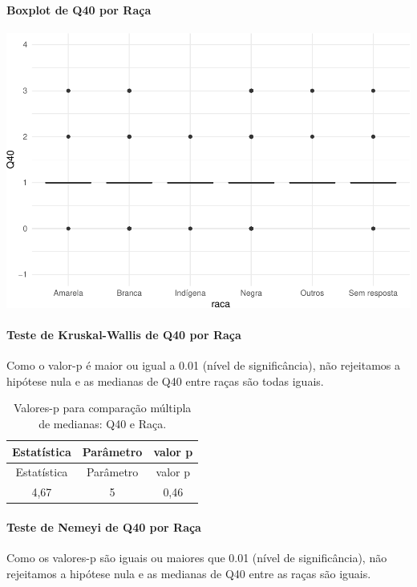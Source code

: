 \documentclass[]{article}
\let\oldparagraph\paragraph
\renewcommand{\paragraph}[1]{\oldparagraph{#1}\mbox{}}
\begin{document}
\hypertarget{boxplot-de-q40-por-rauxe7a}{%
\paragraph{Boxplot de Q40 por Raça}\label{boxplot-de-q40-por-rauxe7a}}

\begin{center}\includegraphics[width=0.75\linewidth]{relatorio_covid19_files/figure-latex/unnamed-chunk-1581-1} \end{center}

\hypertarget{teste-de-kruskal-wallis-de-q40-por-rauxe7a}{%
\paragraph{Teste de Kruskal-Wallis de Q40 por Raça}\label{teste-de-kruskal-wallis-de-q40-por-rauxe7a}}

Como o valor-p é maior ou igual a 0.01 (nível de significância), não rejeitamos a hipótese nula e as medianas de Q40 entre raças são todas iguais.

\begin{longtable}[]{@{}ccc@{}}
\caption{\label{tab:unnamed-chunk-1583}Valores-p para comparação múltipla de medianas: Q40 e Raça.}\tabularnewline
\toprule
Estatística & Parâmetro & valor p\tabularnewline
\midrule
\endfirsthead
\toprule
Estatística & Parâmetro & valor p\tabularnewline
\midrule
\endhead
4,67 & 5 & 0,46\tabularnewline
\bottomrule
\end{longtable}

\hypertarget{teste-de-nemeyi-de-q40-por-rauxe7a}{%
\paragraph{Teste de Nemeyi de Q40 por Raça}\label{teste-de-nemeyi-de-q40-por-rauxe7a}}

Como os valores-p são iguais ou maiores que 0.01 (nível de significância), não rejeitamos a hipótese nula e as medianas de Q40 entre as raças são iguais.
\end{document}
